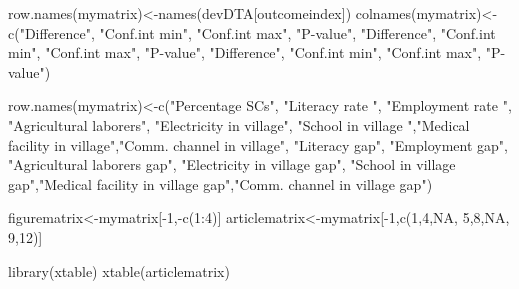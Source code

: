 \documentclass[
]{article}
\newenvironment{Shaded}{\begin{snugshade}}{\end{snugshade}}
\newcommand{\ConstantTok}[1]{\textcolor[rgb]{0.00,0.00,0.00}{#1}}
\newcommand{\DecValTok}[1]{\textcolor[rgb]{0.00,0.00,0.81}{#1}}
\newcommand{\FunctionTok}[1]{\textcolor[rgb]{0.00,0.00,0.00}{#1}}
\newcommand{\NormalTok}[1]{#1}
\newcommand{\OtherTok}[1]{\textcolor[rgb]{0.56,0.35,0.01}{#1}}
\newcommand{\SpecialCharTok}[1]{\textcolor[rgb]{0.00,0.00,0.00}{#1}}
\newcommand{\StringTok}[1]{\textcolor[rgb]{0.31,0.60,0.02}{#1}}
\begin{document}
\begin{Shaded}
\begin{Highlighting}[]
\FunctionTok{row.names}\NormalTok{(mymatrix)}\OtherTok{\textless{}{-}}\FunctionTok{names}\NormalTok{(devDTA[outcomeindex])}
\FunctionTok{colnames}\NormalTok{(mymatrix)}\OtherTok{\textless{}{-}}\FunctionTok{c}\NormalTok{(}\StringTok{"Difference"}\NormalTok{, }\StringTok{"Conf.int min"}\NormalTok{, }\StringTok{"Conf.int max"}\NormalTok{, }\StringTok{"P{-}value"}\NormalTok{, }\StringTok{"Difference"}\NormalTok{, }\StringTok{"Conf.int min"}\NormalTok{, }\StringTok{"Conf.int max"}\NormalTok{, }\StringTok{"P{-}value"}\NormalTok{, }\StringTok{"Difference"}\NormalTok{, }\StringTok{"Conf.int min"}\NormalTok{, }\StringTok{"Conf.int max"}\NormalTok{, }\StringTok{"P{-}value"}\NormalTok{)}

\FunctionTok{row.names}\NormalTok{(mymatrix)}\OtherTok{\textless{}{-}}\FunctionTok{c}\NormalTok{(}\StringTok{"Percentage SCs"}\NormalTok{, }\StringTok{"Literacy rate "}\NormalTok{, }\StringTok{"Employment rate "}\NormalTok{, }\StringTok{"Agricultural laborers"}\NormalTok{, }\StringTok{"Electricity in village"}\NormalTok{, }\StringTok{"School in village "}\NormalTok{,}\StringTok{"Medical facility in village"}\NormalTok{,}\StringTok{"Comm. channel in village"}\NormalTok{,}
\StringTok{"Literacy gap"}\NormalTok{, }\StringTok{"Employment gap"}\NormalTok{, }\StringTok{"Agricultural laborers gap"}\NormalTok{,   }\StringTok{"Electricity in village gap"}\NormalTok{, }\StringTok{"School in village gap"}\NormalTok{,}\StringTok{"Medical facility in village gap"}\NormalTok{,}\StringTok{"Comm. channel in village gap"}\NormalTok{)}

\NormalTok{figurematrix}\OtherTok{\textless{}{-}}\NormalTok{mymatrix[}\SpecialCharTok{{-}}\DecValTok{1}\NormalTok{,}\SpecialCharTok{{-}}\FunctionTok{c}\NormalTok{(}\DecValTok{1}\SpecialCharTok{:}\DecValTok{4}\NormalTok{)]}
\NormalTok{articlematrix}\OtherTok{\textless{}{-}}\NormalTok{mymatrix[}\SpecialCharTok{{-}}\DecValTok{1}\NormalTok{,}\FunctionTok{c}\NormalTok{(}\DecValTok{1}\NormalTok{,}\DecValTok{4}\NormalTok{,}\ConstantTok{NA}\NormalTok{, }\DecValTok{5}\NormalTok{,}\DecValTok{8}\NormalTok{,}\ConstantTok{NA}\NormalTok{, }\DecValTok{9}\NormalTok{,}\DecValTok{12}\NormalTok{)]}

\FunctionTok{library}\NormalTok{(xtable)}
\FunctionTok{xtable}\NormalTok{(articlematrix)}
\end{Highlighting}
\end{Shaded}
\end{document}
